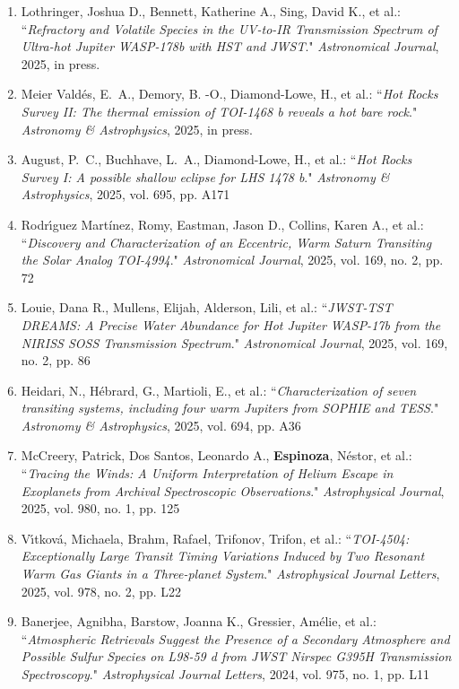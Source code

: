 \documentclass[12pt, a4paper]{article} %
\begin{document}
\begin{flushleft}
\begin{enumerate}
\item Lothringer, Joshua D., Bennett, Katherine A., Sing, David K., et al.: ``\textit{Refractory and Volatile Species in the UV-to-IR Transmission Spectrum of Ultra-hot Jupiter WASP-178b with HST and JWST}." \textit{Astronomical Journal}, 2025, in press. 
\item Meier Valdés, E.~A., Demory, B. -O., Diamond-Lowe, H., et al.: ``\textit{Hot Rocks Survey II: The thermal emission of TOI-1468 b reveals a hot bare rock}." \textit{Astronomy \& Astrophysics}, 2025, in press.
\item August, P.~C., Buchhave, L.~A., Diamond-Lowe, H., et al.: ``\textit{Hot Rocks Survey I: A possible shallow eclipse for LHS 1478 b}." \textit{Astronomy \& Astrophysics}, 2025, vol. 695, pp. A171
\item Rodrı́guez Mart\'inez, Romy, Eastman, Jason D., Collins, Karen A., et al.: ``\textit{Discovery and Characterization of an Eccentric, Warm Saturn Transiting the Solar Analog TOI-4994}." \textit{Astronomical Journal}, 2025, vol. 169, no. 2, pp. 72
\item Louie, Dana R., Mullens, Elijah, Alderson, Lili, et al.: ``\textit{JWST-TST DREAMS: A Precise Water Abundance for Hot Jupiter WASP-17b from the NIRISS SOSS Transmission Spectrum}." \textit{Astronomical Journal}, 2025, vol. 169, no. 2, pp. 86
\item Heidari, N., Hébrard, G., Martioli, E., et al.: ``\textit{Characterization of seven transiting systems, including four warm Jupiters from SOPHIE and TESS}." \textit{Astronomy \& Astrophysics}, 2025, vol. 694, pp. A36
\item McCreery, Patrick, Dos Santos, Leonardo A., \textbf{Espinoza}, Néstor, et al.: ``\textit{Tracing the Winds: A Uniform Interpretation of Helium Escape in Exoplanets from Archival Spectroscopic Observations}." \textit{Astrophysical Journal}, 2025, vol. 980, no. 1, pp. 125
\item Vı́tková, Michaela, Brahm, Rafael, Trifonov, Trifon, et al.: ``\textit{TOI-4504: Exceptionally Large Transit Timing Variations Induced by Two Resonant Warm Gas Giants in a Three-planet System}." \textit{Astrophysical Journal Letters}, 2025, vol. 978, no. 2, pp. L22
\item Banerjee, Agnibha, Barstow, Joanna K., Gressier, Amélie, et al.: ``\textit{Atmospheric Retrievals Suggest the Presence of a Secondary Atmosphere and Possible Sulfur Species on L98-59 d from JWST Nirspec G395H Transmission Spectroscopy}." \textit{Astrophysical Journal Letters}, 2024, vol. 975, no. 1, pp. L11

\end{enumerate}
\end{flushleft}
\end{document}
